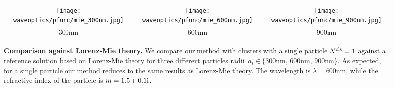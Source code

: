 \begin{figure}[h]
    \centering
    \setlength{\resLen}{2.2in}
    \addtolength{\tabcolsep}{-6pt}
    \begin{tabular}{ccc}
        \texttt{[image: waveoptics/pfunc/mie\_300nm.jpg]} & 
        \texttt{[image: waveoptics/pfunc/mie\_600nm.jpg]} &  
        \texttt{[image: waveoptics/pfunc/mie\_900nm.jpg]} 
        \\ 
        300nm & 600nm & 900nm
    \end{tabular}
    \caption[Comparison against Lorenz-Mie theory]{\label{fig:waveoptics:mie}
    	\textbf{Comparison against Lorenz-Mie theory.} We compare our method with clusters with a single particle $N^\mathrm{cls}=1$ against a reference solution based on Lorenz-Mie theory for three different particles radii~$a_i \in \{ \text{300nm, 600nm, 900nm} \}$. As expected, for a single particle our method reduces to the same results as Lorenz-Mie theory. The wavelength is $\lambda=600$nm, while the refractive index of the particle is $m=1.5+0.1\mathrm{i}$.  
	}
\end{figure}

